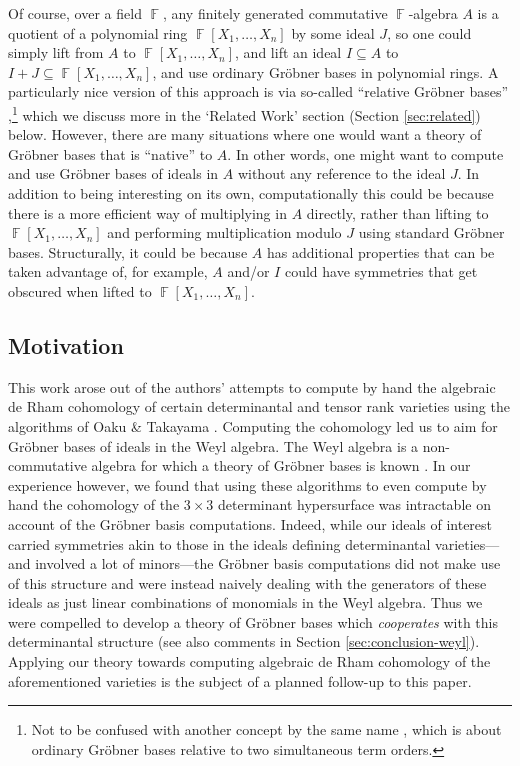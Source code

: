 \documentclass[11pt,reqno]{amsart}
\DeclareMathOperator{\F}{\mathbb{F}}
\newcommand{\gb}{Gr\"{o}bner }
\theoremstyle{definition}
\numberwithin{equation}{section}
\begin{document}
Of course, over a field $\F$, any finitely generated commutative $\F$-algebra $A$ is a quotient of a polynomial ring $\F[X_1, \ldots, X_n]$ by some ideal $J$, so one could simply lift from $A$ to $\F[X_1, \ldots, X_n]$, and lift an ideal $I \subseteq A$ to $I + J \subseteq \F[X_1, \ldots, X_n]$, and use ordinary Gröbner bases in polynomial rings. A particularly nice version of this approach is via so-called ``relative Gröbner bases'' \cite{spear,zacharias,siebert,LaScalaStillman,moraZacharias,HOS},\footnote{Not to be confused with another concept by the same name \cite{zhouWinkler}, which is about ordinary Gröbner bases relative to two simultaneous term orders.} which we discuss more in the 
`Related Work' section (Section \ref{sec:related}) below. However, there are many situations where one would want a theory of Gröbner bases that is ``native'' to $A$. In other words, one might want to compute and use \gb bases of ideals in $A$ without any reference to the ideal $J$. In addition to being interesting on its own, computationally this could be because there is a more efficient way of multiplying in $A$ directly, rather than lifting to $\F[X_1, \ldots, X_n]$ and performing multiplication modulo $J$ using standard Gröbner bases. Structurally, it could be because $A$ has additional properties that can be taken advantage of, for example, $A$ and/or $I$ could have symmetries that get obscured when lifted to $\F[X_1, \ldots, X_n]$.

\subsection{Motivation} 

This work arose out of the authors' attempts to compute by hand the algebraic de Rham cohomology of certain determinantal and tensor rank varieties using the algorithms of Oaku \& Takayama \cite{oakutakayama-derhamalgo-1999, oakutakayama-derham-2001}. Computing the cohomology led us to aim for \gb bases of ideals in the Weyl algebra. The Weyl algebra is a non-commutative algebra for which a theory of Gröbner bases is known \cite{saito1998grobner}. In our experience however, we found that using these algorithms to even compute by hand the cohomology of the $3 \times 3$ determinant hypersurface was intractable on account of the \gb basis computations. Indeed, while our ideals of interest carried symmetries akin to those in the ideals defining determinantal varieties---and involved a lot of minors---the \gb basis computations did not make use of this structure and were instead naively dealing with the generators of these ideals as just linear combinations of monomials in the Weyl algebra. Thus we were compelled to develop a theory of \gb bases which \emph{cooperates} with this determinantal structure (see also comments in Section \ref{sec:conclusion-weyl}). Applying our theory towards computing algebraic de Rham cohomology of the aforementioned varieties is the subject of a planned follow-up to this paper.
\end{document}
